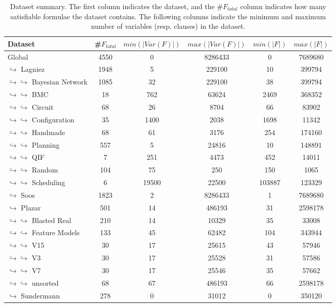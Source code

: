 \documentclass{article}
\newcommand\var{\textit{Var}}
\begin{document}
    
\begin{table}[h!]
        \centering
            \begin{tabular}{l|c|c|c|c|c}
                Dataset & \#$F_\textit{total}$ & $\textit{min}(|\var(F)|)$ & $\textit{max}(|\var(F)|)$ & $\textit{min}(|F|)$ & $\textit{max}(|F|)$ \\
                \hline
    
Global & 4550 & 0 & 8286433 & 0 & 7689680 \\
$\hookrightarrow$ Lagniez \cite{D4} & 1948 & 5 & 229100 & 10 & 399794 \\
$\hookrightarrow \hookrightarrow$ Bayesian Network & 1085 & 32 & 229100 & 38 & 399794 \\
$\hookrightarrow \hookrightarrow$ BMC & 18 & 762 & 63624 & 2469 & 368352 \\
$\hookrightarrow \hookrightarrow$ Circuit & 68 & 26 & 8704 & 66 & 83902 \\
$\hookrightarrow \hookrightarrow$ Configuration & 35 & 1400 & 2038 & 1698 & 11342 \\
$\hookrightarrow \hookrightarrow$ Handmade & 68 & 61 & 3176 & 254 & 174160 \\
$\hookrightarrow \hookrightarrow$ Planning & 557 & 5 & 24816 & 10 & 148891 \\
$\hookrightarrow \hookrightarrow$ QIF & 7 & 251 & 4473 & 452 & 14011 \\
$\hookrightarrow \hookrightarrow$ Random & 104 & 75 & 250 & 150 & 1065 \\
$\hookrightarrow \hookrightarrow$ Scheduling & 6 & 19500 & 22500 & 103887 & 123329 \\
$\hookrightarrow$ Soos \cite{soos_2024_10449477} & 1823 & 2 & 8286433 & 1 & 7689680 \\
$\hookrightarrow$ Plazar \cite{Plazar2019} & 501 & 14 & 486193 & 31 & 2598178 \\
$\hookrightarrow \hookrightarrow$ Blasted Real & 210 & 14 & 10329 & 35 & 33008 \\
$\hookrightarrow \hookrightarrow$ Feature Models & 133 & 45 & 62482 & 104 & 343944 \\
$\hookrightarrow \hookrightarrow$ V15 & 30 & 17 & 25615 & 43 & 57946 \\
$\hookrightarrow \hookrightarrow$ V3 & 30 & 17 & 25528 & 31 & 57586 \\
$\hookrightarrow \hookrightarrow$ V7 & 30 & 17 & 25546 & 35 & 57662 \\
$\hookrightarrow \hookrightarrow$ unsorted & 68 & 67 & 486193 & 66 & 2598178 \\
$\hookrightarrow$ Sundermann \cite{SBK+:SPLC24} & 278 & 0 & 31012 & 0 & 350120 \\
            \end{tabular}
                \caption{Dataset summary.
            The first column indicates the dataset, and the \#$F_\textit{total}$ column indicates how many satisfiable formulae the dataset contains.
            The following columns indicate the minimum and maximum number of variables (resp. clauses) in the dataset.}
        \label{results:tab:datasets}
    \end{table}
\end{document}

